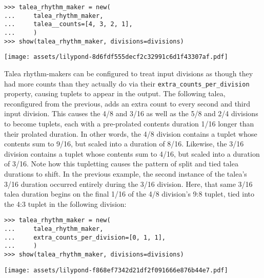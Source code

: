 \begin{singlespacing}
\vspace{-0.5\baselineskip}
\begin{lstlisting}
>>> talea_rhythm_maker = new(
...     talea_rhythm_maker,
...     talea__counts=[4, 3, 2, 1],
...     )
>>> show(talea_rhythm_maker, divisions=divisions)
\end{lstlisting}
\noindent\texttt{[image: assets/lilypond-8d6fdf555decf2c32991c6d1f43307af.pdf]}
\end{singlespacing}

\noindent Talea rhythm-makers can be configured to treat input divisions as
though they had more counts than they actually do via their
\texttt{extra\_counts\_per\_division} property, causing tuplets to appear in
the output. The following talea, reconfigured from the previous, adds an extra
count to every second and third input division. This causes the 4/8 and 3/16 as
well as the 5/8 and 2/4 divisions to become tuplets, each with a pre-prolated
contents duration 1/16 longer than their prolated duration. In other words, the 4/8
division contains a tuplet whose contents sum to 9/16, but scaled into a
duration of 8/16. Likewise, the 3/16 division contains a tuplet whose contents
sum to 4/16, but scaled into a duration of 3/16. Note how this tupletting
causes the pattern of split and tied talea durations to shift. In the previous
example, the second instance of the talea's 3/16 duration occurred entirely
during the 3/16 division. Here, that same 3/16 talea duration begins on the
final 1/16 of the 4/8 division's 9:8 tuplet, tied into the 4:3 tuplet in the
following division:

\begin{comment}
<abjad>
talea_rhythm_maker = new(
    talea_rhythm_maker,
    extra_counts_per_division=[0, 1, 1],
    )
show(talea_rhythm_maker, divisions=divisions)
</abjad>
\end{comment}

\begin{singlespacing}
\vspace{-0.5\baselineskip}
\begin{lstlisting}
>>> talea_rhythm_maker = new(
...     talea_rhythm_maker,
...     extra_counts_per_division=[0, 1, 1],
...     )
>>> show(talea_rhythm_maker, divisions=divisions)
\end{lstlisting}
\noindent\texttt{[image: assets/lilypond-f868ef7342d21df2f091666e876b44e7.pdf]}
\end{singlespacing}

